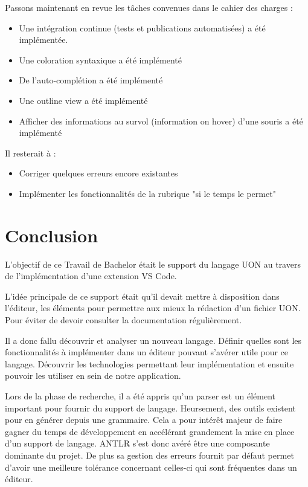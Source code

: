 \documentclass[
    iict, %
    il, %
]{heig-tb}
\begin{document}
Passons maintenant en revue les tâches convenues dans le cahier des charges :

\begin{itemize}
    \item Une intégration continue (tests et publications automatisées) a été implémentée.
    \item Une coloration syntaxique a été implémenté
    \item De l'auto-complétion a été implémenté
    \item Une outline view a été implémenté
    \item Afficher des informations au survol (information on hover) d'une souris a été implémenté
\end{itemize}

Il resterait à :

\begin{itemize}
    \item Corriger quelques erreurs encore existantes
    \item Implémenter les fonctionnalités de la rubrique "si le temps le permet"
\end{itemize}

\chapter{Conclusion}



L'objectif de ce Travail de Bachelor était le support du langage UON au travers de l'implémentation d'une extension VS Code.

L'idée principale de ce support était qu'il devait mettre à disposition dans l'éditeur, les éléments pour permettre aux mieux la rédaction d'un fichier UON.
Pour éviter de devoir consulter la documentation régulièrement.

Il a donc fallu découvrir et analyser un nouveau langage.
Définir quelles sont les fonctionnalités à implémenter dans un éditeur pouvant s'avérer utile pour ce langage.
Découvrir les technologies permettant leur implémentation et ensuite pouvoir les utiliser en sein de notre application.

Lors de la phase de recherche, il a été appris qu'un parser est un élément important pour fournir du support de langage.
Heursement, des outils existent pour en générer depuis une grammaire. Cela a pour intérêt majeur de faire gagner du temps de développement en accélérant grandement la mise en place d'un support de langage.
ANTLR s'est donc avéré être une composante dominante du projet. De plus sa gestion des erreurs fournit par défaut permet d'avoir une meilleure tolérance concernant celles-ci
qui sont fréquentes dans un éditeur.
\end{document}
